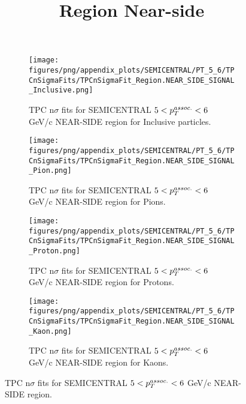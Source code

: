             \begin{figure}[H]
                \title{Region Near-side}
                \begin{subfigure}[b]{0.5\textwidth}
                    \centering
                    \texttt{[image: figures/png/appendix\_plots/SEMICENTRAL/PT\_5\_6/TPCnSigmaFits/TPCnSigmaFit\_Region.NEAR\_SIDE\_SIGNAL\_Inclusive.png]}
                    \caption{TPC n$\sigma$ fits for SEMICENTRAL $5 < \pTassoc < 6$ GeV/c NEAR-SIDE region for Inclusive particles.}
                    \label{fig:appendix_SEMICENTRAL_$5 < \pTassoc < 6$ GeV/c_NEAR_SIDE_SIGNAL_Inclusive}
                \end{subfigure}
                \begin{subfigure}[b]{0.5\textwidth}
                    \centering
                    \texttt{[image: figures/png/appendix\_plots/SEMICENTRAL/PT\_5\_6/TPCnSigmaFits/TPCnSigmaFit\_Region.NEAR\_SIDE\_SIGNAL\_Pion.png]}
                    \caption{TPC n$\sigma$ fits for SEMICENTRAL $5 < \pTassoc < 6$ GeV/c NEAR-SIDE region for Pions.}
                    \label{fig:appendix_SEMICENTRAL_$5 < \pTassoc < 6$ GeV/c_NEAR_SIDE_SIGNAL_Pion}
                \end{subfigure}
                \begin{subfigure}[b]{0.5\textwidth}
                    \centering
                    \texttt{[image: figures/png/appendix\_plots/SEMICENTRAL/PT\_5\_6/TPCnSigmaFits/TPCnSigmaFit\_Region.NEAR\_SIDE\_SIGNAL\_Proton.png]}
                    \caption{TPC n$\sigma$ fits for SEMICENTRAL $5 < \pTassoc < 6$ GeV/c NEAR-SIDE region for Protons.}
                    \label{fig:appendix_SEMICENTRAL_$5 < \pTassoc < 6$ GeV/c_NEAR_SIDE_SIGNAL_Proton}
                \end{subfigure}
                \begin{subfigure}[b]{0.5\textwidth}
                    \centering
                    \texttt{[image: figures/png/appendix\_plots/SEMICENTRAL/PT\_5\_6/TPCnSigmaFits/TPCnSigmaFit\_Region.NEAR\_SIDE\_SIGNAL\_Kaon.png]}
                    \caption{TPC n$\sigma$ fits for SEMICENTRAL $5 < \pTassoc < 6$ GeV/c NEAR-SIDE region for Kaons.}
                    \label{fig:appendix_SEMICENTRAL_$5 < \pTassoc < 6$ GeV/c_NEAR_SIDE_SIGNAL_Kaon}
                \end{subfigure}
                \caption{TPC n$\sigma$ fits for SEMICENTRAL $5 < \pTassoc < 6$ GeV/c NEAR-SIDE region.}
                \label{fig:appendix_SEMICENTRAL_$5 < \pTassoc < 6$ GeV/c_NEAR_SIDE_SIGNAL}
            \end{figure}
